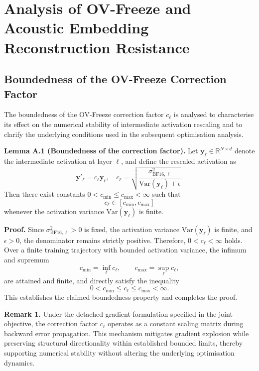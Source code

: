 \documentclass[a4paper,fleqn]{cas-sc}
\begin{document}
\appendix

\section{Analysis of OV-Freeze and Acoustic Embedding Reconstruction Resistance}
\label{app:ovf}

\subsection{Boundedness of the OV-Freeze Correction Factor}
\label{app:bounded}

The boundedness of the OV-Freeze correction factor $c_\ell$ is analysed to characterise its effect on the numerical stability of intermediate activation rescaling and to clarify the underlying conditions used in the subsequent optimisation analysis.

\medskip
\noindent\textbf{Lemma A.1 (Boundedness of the correction factor).}
Let $\mathbf{y}_\ell \in \mathbb{R}^{N \times d}$ denote the intermediate activation at layer $\ell$, and define the rescaled activation as
\[
\mathbf{y}'_\ell = c_\ell \mathbf{y}_\ell, \quad
c_\ell = \sqrt{\frac{\sigma^2_{\mathrm{BF16},\ell}}{\mathrm{Var}(\mathbf{y}_\ell)+\epsilon}}.
\]
Then there exist constants $0 < c_{\min} \le c_{\max} < \infty$ such that
\[
c_\ell \in [c_{\min}, c_{\max}]
\]
whenever the activation variance $\mathrm{Var}(\mathbf{y}_\ell)$ is finite.

\medskip
\noindent\textbf{Proof.}
Since $\sigma^2_{\mathrm{BF16},\ell} > 0$ is fixed, the activation variance $\mathrm{Var}(\mathbf{y}_\ell)$ is finite, and $\epsilon > 0$, the denominator remains strictly positive. Therefore, $0 < c_\ell < \infty$ holds. Over a finite training trajectory with bounded activation variance, the infimum and supremum
\[
c_{\min} = \inf_{\ell} c_\ell, \qquad c_{\max} = \sup_{\ell} c_\ell,
\]
are attained and finite, and directly satisfy the inequality
\[
0 < c_{\min} \le c_\ell \le c_{\max} < \infty.
\]
This establishes the claimed boundedness property and completes the proof.

\medskip
\noindent\textbf{Remark 1.}
Under the detached-gradient formulation specified in the joint objective, the correction factor $c_\ell$ operates as a constant scaling matrix during backward error propagation. This mechanism mitigates gradient explosion while preserving structural directionality within established bounded limits, thereby supporting numerical stability without altering the underlying optimisation dynamics.
\end{document}
